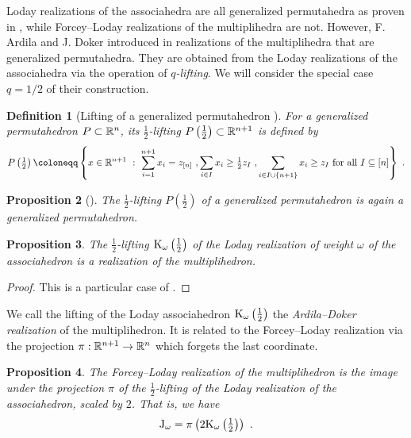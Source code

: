 \documentclass[twoside, 12pt]{amsart}
\newtheorem{definition}{Definition}[section]
\newtheorem{proposition}[definition]{Proposition}
\theoremstyle{remark}
\begin{document}
Loday realizations of the associahedra are all generalized permutahedra as proven in \cite{}, while Forcey--Loday realizations of the multiplihedra are not. 
However, F. Ardila and J. Doker introduced in \cite{AD13} realizations of the multiplihedra that are generalized permutahedra. 
They are obtained from the Loday realizations of the associahedra via the operation of \emph{$q$-lifting}. 
We will consider the special case $q=1/2$ of their construction.

\begin{definition}[Lifting of a generalized permutahedron {\cite[Definition 2.3]{AD13}}]
For a generalized permutahedron $P\subset \mathbb{R}^n$, its \emph{$\tfrac{1}{2}$-lifting} $P \left(\tfrac{1}{2}\right) \subset \mathbb{R}^{n+1}$ is defined by 
\[P \left(\tfrac{1}{2}\right) \coloneqq \left\{ x \in \RR^{n+1} \ : \ 
\sum_{i=1}^{n+1} x_i = z_{[n]} \ , 
\sum_{i \in I} x_i \geq \tfrac{1}{2}z_I \ ,
\sum_{i \in I \cup \{n+1\}} x_i \geq z_I 
\text{ for all } I \subseteq [n] \right\} \ . \]
\end{definition}

\begin{proposition}[{\cite[Proposition 2.4]{AD13}}] 
The $\tfrac{1}{2}$-lifting $P \left(\tfrac{1}{2}\right)$ of a generalized permutahedron is again a generalized permutahedron. 
\end{proposition}

\begin{proposition} 
The $\tfrac{1}{2}$-lifting $\mathrm{K}_\omega\left(\tfrac{1}{2}\right)$ of the Loday realization of weight $\omega$ of the associahedron is a realization of the multiplihedron. 
\end{proposition}
\begin{proof} 
This is a particular case of \cite[Corollary 4.10]{AD13}.
\end{proof}

We call the lifting of the Loday associahedron $\mathrm{K}_\omega\left(\tfrac{1}{2}\right)$ the\emph{ Ardila--Doker realization} of the multiplihedron. It is related to the Forcey--Loday realization via the projection $\pi: \mathbb{R}^{n+1} \to \mathbb{R}^n$ which forgets the last coordinate. 
 
\begin{proposition} 
\label{prop:lifting} 
The Forcey--Loday realization of the multiplihedron is the image under the projection $\pi$ of the $\tfrac{1}{2}$-lifting of the Loday realization of the associahedron, scaled by $2$. 
That is, we have  \[ \mathrm{J}_\omega = \pi \left(2 \mathrm{K}_\omega\left(\tfrac{1}{2}\right)\right) \ . \]
\end{proposition}
\end{document}
